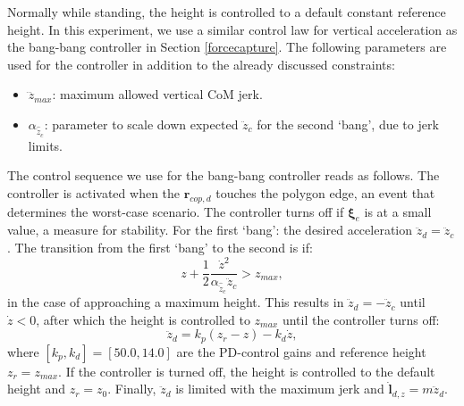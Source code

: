 \documentclass[letterpaper, 10 pt, conference]{ieeeconf}  %
\newcommand{\zmax}{z_{max}}
\newcommand{\rcmpd}{\mathbf{r}_{cop,d}}
\newcommand{\icpe}{\boldsymbol{\xi}_e}
\begin{document}
Normally while standing, the height is controlled to a default constant reference height. In this experiment, we use a similar control law for vertical acceleration as the bang-bang controller in Section \ref{forcecapture}. The following parameters are used for the controller in addition to the already discussed constraints:
\begin{itemize}
	\item $\dddot{z}_{max}$: maximum allowed vertical CoM jerk.
	\item $\alpha_{\hat{\ddot{z}}_{c}}$: parameter to scale down expected $\ddot{z}_c$ for the second `bang', due to jerk limits.
\end{itemize}

The control sequence we use for the bang-bang controller reads as follows. The controller is activated when the $\rcmpd$ touches the polygon edge, an event that determines the worst-case scenario. The controller turns off if $\icpe$ is at a small value, a measure for stability. For the first `bang': the desired acceleration $\ddot{z}_d=\ddot{z}_c$. The transition from the first `bang' to the second is if:
\begin{equation}
	z+\frac{1}{2}\frac{\dot{z}^2}{\alpha_{\hat{\ddot{z}}_{c}}\ddot{z}_{c}} >\zmax,
\end{equation}
in the case of approaching a maximum height. This results in $\ddot{z}_d=-\ddot{z}_c$ until $\dot{z}<0$, after which the height is controlled to $\zmax$ until the controller turns off:
\begin{equation}
	\ddot{z}_d = k_p(z_r-z)-k_d\dot{z},
\end{equation}
where $[k_p,k_d]=[50.0,14.0]$ are the PD-control gains and reference height $z_r= \zmax$. If the controller is turned off, the height is controlled to the default height and $z_r=z_0$. Finally, $\ddot{z}_d$ is limited with the maximum jerk and $\dot{\mathbf{l}}_{d,z}=m\ddot{z}_d$.
\end{document}
